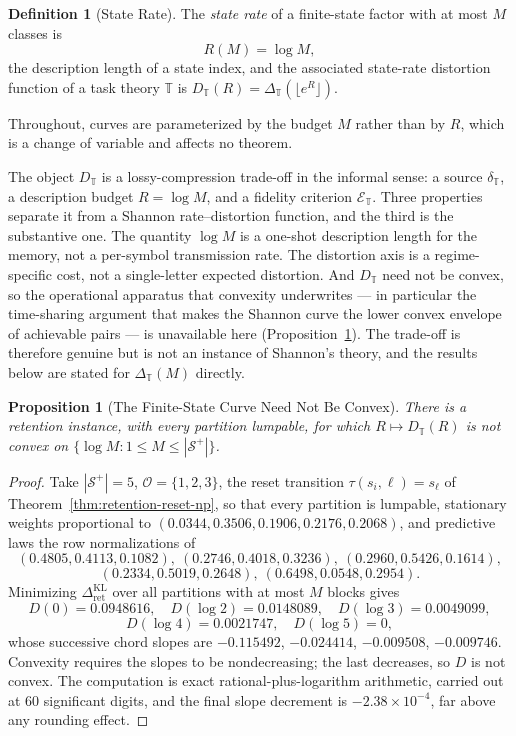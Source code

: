 \documentclass[12pt]{article}
\newtheorem{proposition}[theorem]{Proposition}
\theoremstyle{definition}
\newtheorem{definition}[theorem]{Definition}
\newcommand{\RetKL}{\Delta_{\mathrm{ret}}^{\mathrm{KL}}}
\newcommand{\Splus}{\mathcal S^{+}}
\begin{document}
\begin{definition}[State Rate]
\label{def:state-rate}
The \emph{state rate} of a finite-state factor with at most $M$ classes is
\[
R(M)=\log M ,
\]
the description length of a state index, and the associated
state-rate distortion function of a task theory $\mathbb T$ is
$D_{\mathbb T}(R)=\Delta_{\mathbb T}(\lfloor e^{R}\rfloor)$.

Throughout, curves are parameterized by the budget $M$ rather than by $R$,
which is a change of variable and affects no theorem.

The object $D_{\mathbb T}$ is a lossy-compression trade-off in the informal
sense: a source $\delta_{\mathbb T}$, a description budget $R=\log M$, and a
fidelity criterion $\mathcal E_{\mathbb T}$.  Three properties separate it
from a Shannon rate--distortion function, and the third is the substantive one.
The quantity $\log M$ is a one-shot description length for the memory, not a
per-symbol transmission rate.  The distortion axis is a regime-specific cost,
not a single-letter expected distortion.  And $D_{\mathbb T}$ need not be
convex, so the operational apparatus that convexity underwrites --- in
particular the time-sharing argument that makes the Shannon curve the lower
convex envelope of achievable pairs --- is unavailable here
(Proposition~\ref{prop:rd-nonconvex}).  The trade-off is therefore genuine but
is not an instance of Shannon's theory, and the results below are stated for
$\Delta_{\mathbb T}(M)$ directly.
\end{definition}

\begin{proposition}[The Finite-State Curve Need Not Be Convex]
\label{prop:rd-nonconvex}
There is a retention instance, with every partition lumpable, for which
$R\mapsto D_{\mathbb T}(R)$ is not convex on $\{\log M:1\le M\le|\Splus|\}$.
\end{proposition}

\begin{proof}
Take $|\Splus|=5$, $\mathcal O=\{1,2,3\}$, the reset transition
$\tau(s_i,\ell)=s_\ell$ of Theorem~\ref{thm:retention-reset-np}, so that every
partition is lumpable, stationary weights proportional to
$(0.0344,0.3506,0.1906,0.2176,0.2068)$, and predictive laws the row
normalizations of
\[
(0.4805,0.4113,0.1082),\ (0.2746,0.4018,0.3236),\ (0.2960,0.5426,0.1614),
\]
\[
(0.2334,0.5019,0.2648),\ (0.6498,0.0548,0.2954).
\]
Minimizing $\RetKL$ over all partitions with at most $M$ blocks gives
\[
D(0)=0.0948616,\quad
D(\log2)=0.0148089,\quad
D(\log3)=0.0049099,
\]
\[
D(\log4)=0.0021747,\quad
D(\log5)=0 ,
\]
whose successive chord slopes are
$-0.115492$, $-0.024414$, $-0.009508$, $-0.009746$.  Convexity requires the
slopes to be nondecreasing; the last decreases, so $D$ is not convex.  The
computation is exact rational-plus-logarithm arithmetic, carried out at $60$
significant digits, and the final slope decrement is $-2.38\times10^{-4}$,
far above any rounding effect.
\end{proof}
\end{document}
